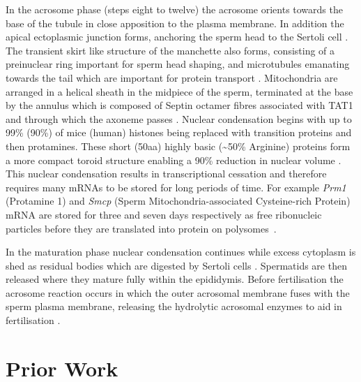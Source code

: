 In the acrosome phase (steps eight to twelve) the acrosome orients towards the base of the tubule in close apposition to the plasma membrane. In addition the apical ectoplasmic junction forms, anchoring the sperm head to the Sertoli cell \parencite{Wong2008Biology}. The transient skirt like structure of the manchette also forms, consisting of a preinuclear ring important for sperm head shaping, and microtubules emanating towards the tail which are important for protein transport \parencite{Lehti2016Formation}. Mitochondria are arranged in a helical sheath in the midpiece of the sperm, terminated at the base by the annulus which is composed of Septin octamer fibres associated with TAT1 and through which the axoneme passes \parencite{Ho2007Three, Toure2011Septins, Kuo2015SEPT12}. Nuclear condensation begins with up to 99\% (90\%) of mice (human) histones being replaced with transition proteins and then protamines. These short (50aa) highly basic (\textasciitilde50\% Arginine) proteins form a more compact toroid structure enabling a 90\% reduction in nuclear volume \parencite{Balhorn2007protamine, Ward2010Function, Yamaguchi2018Reevaluating}. This nuclear condensation results in transcriptional cessation and therefore requires many mRNAs to be stored for long periods of time. For example \textit{Prm1} (Protamine 1) and \textit{Smcp} (Sperm Mitochondria-associated Cysteine-rich Protein) mRNA are stored for three and seven days respectively as free ribonucleic particles before they are translated into protein on polysomes~\parencite{Cullinane2015Mechanisms, Kleene1984Translational, Kleene2004Patterns}.

In the maturation phase nuclear condensation continues while excess cytoplasm is shed as residual bodies which are digested by Sertoli cells \parencite{Lacy1962CERTAIN, Breucker1985Morphogenesis, Hermo2010Surfing}. Spermatids are then released where they mature fully within the epididymis. Before fertilisation the acrosome reaction occurs in which the outer acrosomal membrane fuses with the sperm plasma membrane, releasing the hydrolytic acrosomal enzymes to aid in fertilisation \parencite{Jin2011Most}.






\section{Prior Work}

